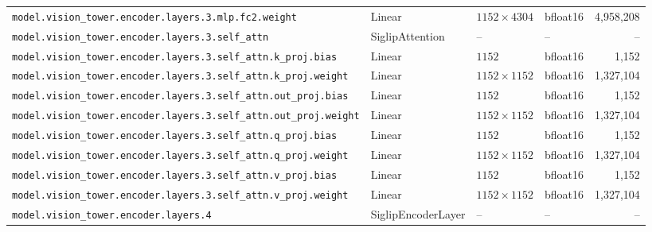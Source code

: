 \documentclass[10pt,a4paper]{article}
\theoremstyle{definition}
\begin{document}
\begin{appendices}
{\begin{longtable}{p{6.8cm}>{\raggedright\arraybackslash}p{3.3cm}llr}
\texttt{model.\allowbreak{}vision\_tower.\allowbreak{}encoder.\allowbreak{}layers.\allowbreak{}3.\allowbreak{}mlp.\allowbreak{}fc2.\allowbreak{}weight} & Linear & $1152 \times 4304$ & bfloat16 & 4,958,208 \\
\texttt{model.\allowbreak{}vision\_tower.\allowbreak{}encoder.\allowbreak{}layers.\allowbreak{}3.\allowbreak{}self\_attn} & Siglip\allowbreak{}Attention & -- & -- & -- \\
\texttt{model.\allowbreak{}vision\_tower.\allowbreak{}encoder.\allowbreak{}layers.\allowbreak{}3.\allowbreak{}self\_attn.\allowbreak{}k\_proj.\allowbreak{}bias} & Linear & $1152$ & bfloat16 & 1,152 \\
\texttt{model.\allowbreak{}vision\_tower.\allowbreak{}encoder.\allowbreak{}layers.\allowbreak{}3.\allowbreak{}self\_attn.\allowbreak{}k\_proj.\allowbreak{}weight} & Linear & $1152 \times 1152$ & bfloat16 & 1,327,104 \\
\texttt{model.\allowbreak{}vision\_tower.\allowbreak{}encoder.\allowbreak{}layers.\allowbreak{}3.\allowbreak{}self\_attn.\allowbreak{}out\_proj.\allowbreak{}bias} & Linear & $1152$ & bfloat16 & 1,152 \\
\texttt{model.\allowbreak{}vision\_tower.\allowbreak{}encoder.\allowbreak{}layers.\allowbreak{}3.\allowbreak{}self\_attn.\allowbreak{}out\_proj.\allowbreak{}weight} & Linear & $1152 \times 1152$ & bfloat16 & 1,327,104 \\
\texttt{model.\allowbreak{}vision\_tower.\allowbreak{}encoder.\allowbreak{}layers.\allowbreak{}3.\allowbreak{}self\_attn.\allowbreak{}q\_proj.\allowbreak{}bias} & Linear & $1152$ & bfloat16 & 1,152 \\
\texttt{model.\allowbreak{}vision\_tower.\allowbreak{}encoder.\allowbreak{}layers.\allowbreak{}3.\allowbreak{}self\_attn.\allowbreak{}q\_proj.\allowbreak{}weight} & Linear & $1152 \times 1152$ & bfloat16 & 1,327,104 \\
\texttt{model.\allowbreak{}vision\_tower.\allowbreak{}encoder.\allowbreak{}layers.\allowbreak{}3.\allowbreak{}self\_attn.\allowbreak{}v\_proj.\allowbreak{}bias} & Linear & $1152$ & bfloat16 & 1,152 \\
\texttt{model.\allowbreak{}vision\_tower.\allowbreak{}encoder.\allowbreak{}layers.\allowbreak{}3.\allowbreak{}self\_attn.\allowbreak{}v\_proj.\allowbreak{}weight} & Linear & $1152 \times 1152$ & bfloat16 & 1,327,104 \\
\texttt{model.\allowbreak{}vision\_tower.\allowbreak{}encoder.\allowbreak{}layers.\allowbreak{}4} & Siglip\allowbreak{}Encoder\allowbreak{}Layer & -- & -- & -- \\

\end{longtable}}
\end{appendices}
\end{document}
